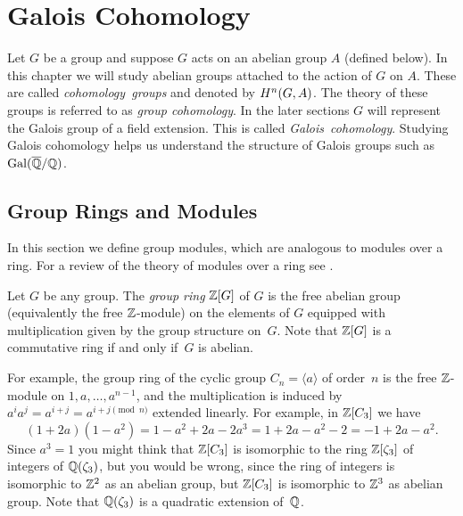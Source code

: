 
\chapter{Galois Cohomology}\label{ch:gc}

Let $G$ be a group and suppose $G$ acts on an abelian group $A$
(defined below). In this chapter we will study abelian groups attached
to the action of $G$ on $A$. These are called \emph{cohomology~groups}
and denoted by $H^n(G,A)$. The theory of these groups is referred
to as \emph{group cohomology}. In the later sections $G$ will represent
the Galois group of a field extension. This is called
\emph{Galois~cohomology}. Studying Galois cohomology helps us
understand the structure of Galois groups such as $\operatorname{Gal}(\overline{\mathbb{Q}}/\mathbb{Q})$.

\section{Group Rings and Modules}

In this section we define group modules, which are analogous
to modules over a ring. For a review of the theory of modules
over a ring see \cite[Ch.~10]{dummit2004abstract}.

\begin{definition}\label{def:groupring}
  Let $G$ be any group. The \emph{group ring} $\mathbb{Z}[G]$ of $G$
  is the free abelian group (equivalently the free $\mathbb{Z}$-module) on the
  elements of $G$ equipped
  with multiplication given by the group structure on~$G$.
  Note that $\mathbb{Z}[G]$ is a commutative ring if and only if~$G$ is
  abelian.
\end{definition}

\begin{example}
  For example, the group ring of the cyclic group
  $C_n=\langle a\rangle$ of order~$n$ is
  the free $\mathbb{Z}$-module on $1,a,\ldots, a^{n-1}$, and the multiplication
  is induced by $a^i a^j = a^{i+j} = a^{i + j \pmod{n}}$ extended
  linearly. For example, in  $\mathbb{Z}[C_3]$ we have
  \[
    (1 + 2 a)(1 - a^2) = 1 - a^2 + 2a - 2 a^3
    = 1 + 2a - a^2 - 2 = -1 + 2a - a^2.
  \]
  Since $a^3 = 1$
  you might think that $\mathbb{Z}[C_3]$ is isomorphic to the ring $\mathbb{Z}[\zeta_3]$
  of integers of $\mathbb{Q}(\zeta_3)$, but you would be wrong, since the ring
  of integers is isomorphic to $\mathbb{Z}^2$ as an abelian group, but $\mathbb{Z}[C_3]$
  is isomorphic to $\mathbb{Z}^3$ as abelian group. Note that $\mathbb{Q}(\zeta_3)$
  is a quadratic extension of~$\mathbb{Q}$.
\end{example}

